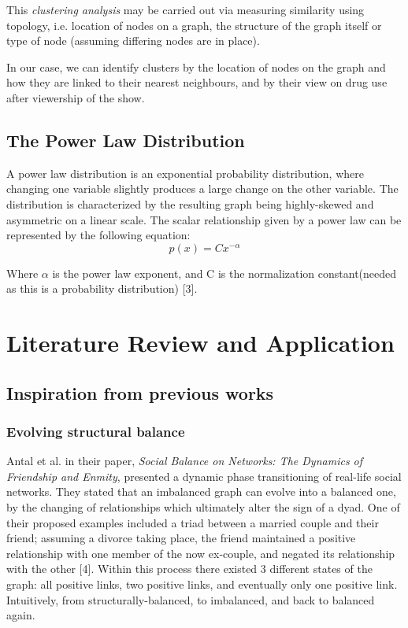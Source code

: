 \documentclass[runningheads]{llncs}
\begin{document}
This \textit{clustering analysis} may be carried out via measuring similarity using topology, i.e. location of nodes on a graph, the structure of the graph itself or type of node (assuming differing nodes are in place).

In our case, we can identify clusters by the location of nodes on the graph and how they are linked to their nearest neighbours, and by their view on drug use after viewership of the show.

\subsection{The Power Law Distribution}
A power law distribution is an exponential probability distribution, where changing one variable slightly produces a large change on the other variable. The distribution is characterized by the resulting graph being highly-skewed and asymmetric on a linear scale. The scalar relationship given by a power law can be represented by the following equation:
\[ p(x) = Cx^{-\alpha} \]

Where $\alpha$ is the power law exponent, and C is the normalization constant(needed as this is a probability distribution) [3]. 


\section{Literature Review and Application}
\subsection{Inspiration from previous works}
\subsubsection{Evolving structural balance}
Antal et al. in their paper, \textit{Social Balance on Networks: The Dynamics of Friendship and Enmity}, presented a dynamic phase transitioning of real-life social networks. They stated that an imbalanced graph can evolve into a balanced one, by the changing of relationships which ultimately alter the sign of a dyad. One of their proposed examples included a triad between a married couple and their friend; assuming a divorce taking place, the friend maintained a positive relationship with one member of the now ex-couple, and negated its relationship with the other [4]. Within this process there existed 3 different states of the graph: all positive links, two positive links, and eventually only one positive link. Intuitively, from structurally-balanced, to imbalanced, and back to balanced again.
\end{document}

